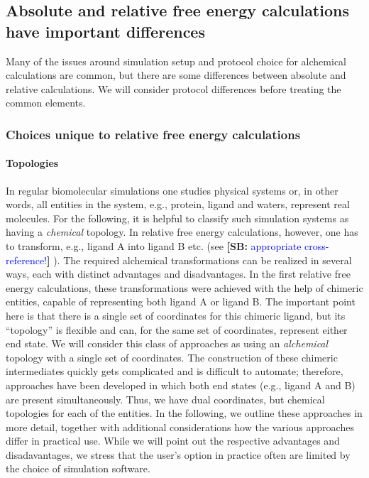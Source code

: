 \documentclass[9pt,bestpractices]{livecoms}
\newcommand{\sbnote}[1]{%
  {\bfseries{}[SB: }%
  {\textcolor{blue}{#1}}{\bfseries{}]}
}
\begin{document}
\subsection{Absolute and relative free energy calculations have important differences}
Many of the issues around simulation setup and protocol choice for alchemical calculations are common, but there are some differences between absolute and relative calculations. We will consider protocol differences before treating the common elements.

\subsubsection{Choices unique to relative free energy calculations}
\label{sec:relative-fe-protocol}

\paragraph{Topologies} In regular biomolecular simulations one studies physical systems or, in other words, all entities in the system, e.g., protein, ligand and waters, represent real molecules. For the following, it is helpful to classify such simulation systems as having a {\em chemical} topology. In relative free energy calculations, however, one has to transform, e.g., ligand A into ligand B etc. (see \sbnote{appropriate cross-reference!}). The required alchemical transformations can be realized in several ways, each with distinct advantages and disadvantages. In the first relative free energy calculations, these transformations were achieved with the help of chimeric entities, capable of representing both ligand A or ligand B. The important point here is that there is a single set of coordinates for this chimeric ligand, but its ``topology'' is flexible and can, for the same set of coordinates, represent either end state. We will consider this class of approaches as using an {\em alchemical} topology with a single set of coordinates. The construction of these chimeric intermediates quickly gets complicated and is difficult to automate; therefore, approaches have been developed in which both end states (e.g., ligand A and B) are present simultaneously. Thus, we have dual coordinates, but chemical topologies for each of the entities. In the following, we outline these approaches in more detail, together with additional considerations how the various approaches differ in practical use. While we will point out the respective advantages and disadavantages, we stress that the user's option in practice often are limited by the choice of simulation software.
\end{document}
